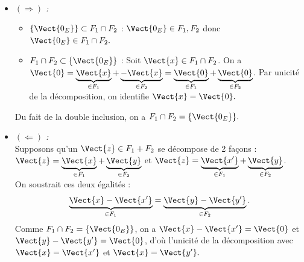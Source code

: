 \documentclass{book}
\begin{document}
\begin{Demonstration}$\quad $\\
\label{Proof:critere2}
\begin{itemize}
\item \textit{$(\Longrightarrow)$ :}
\begin{itemize}[label=*]
\item \textit{$\{\Vect{0_E}\}   \subset  F_1\cap F_2$} :
$\Vect{0_E}\in F_1,F_2$ donc $\Vect{0_E}\in F_1\cap F_2 .$ 
\item \textit{$F_1\cap F_2  \subset \{\Vect{0_E}\} $} :
Soit $\Vect{x}\in F_1\cap F_2$. 
On a $\Vect{0}= \underbrace{\Vect{x}}_{\in F_1} + \underbrace{-\Vect{x}}_{\in F_2}= \underbrace{\Vect{0}}_{\in F_1} + \underbrace{\Vect{0}}_{\in F_2}$. Par unicité de la décomposition, on identifie $\Vect{x}=\Vect{0}.$
\end{itemize}
Du fait de la double inclusion, on a $F_1\cap F_2 = \{\Vect{0_E}\}.$\\
\item \textit{$(\Longleftarrow)$ :}\\
Supposons qu'un $\Vect{z} \in F_1+F_2$  se décompose de 2 façons :$\Vect{z}= \underbrace{\Vect{x}}_{\in F_1} + \underbrace{\Vect{y}}_{\in F_2}$ et $\Vect{z}= \underbrace{\Vect{x'}}_{\in F_1} + \underbrace{\Vect{y}}_{\in F_2}$. \\
On soustrait ces deux égalités :
$$\underbrace{\Vect{x} -\Vect{x'} }_{\in F_1}=\underbrace{\Vect{y} -\Vect{y'} }_{\in F_2}.$$
Comme $F_1\cap F_2 = \{\Vect{0_E}\}$, on a $\Vect{x} -\Vect{x'}=\Vect{0}$ et $\Vect{y} -\Vect{y'} =\Vect{0}$, d'où l'unicité de la décomposition avec $\Vect{x} =\Vect{x'}$ et $\Vect{x}=\Vect{y'}.$
\end{itemize}

\end{Demonstration}
\end{document}

